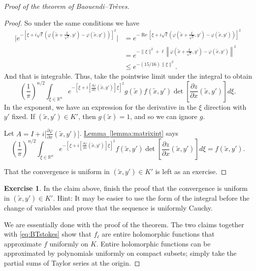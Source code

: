 \documentclass[12pt,openany]{book}
\renewcommand{\Re}{\operatorname{Re}}
\newcommand{\snorm}[1]{\lVert {#1} \rVert}
\newcommand{\bbabs}[1]{\biggl\lvert {#1} \biggr\rvert}
\newcommand{\norm}[1]{\left\lVert {#1} \right\rVert}
\newcommand{\R}{{\mathbb{R}}}
\theoremstyle{plain}
\theoremstyle{remark}
\theoremstyle{definition}
\newenvironment{exbox}{%
    \def\FrameCommand{\vrule width 1pt \relax\hspace{10pt}}%
    \MakeFramed{\advance\hsize-\width\FrameRestore}%
}{%
    \endMakeFramed
}
\theoremstyle{exercise}
\newtheorem{exercise}{Exercise}[section]
\theoremstyle{example}
\newcommand{\lemmaref}[1]{\hyperref[#1]{Lemma~\ref*{#1}}}
\begin{document}
\begin{proof}[Proof of the theorem of Baouendi--Tr{\`e}ves]
\begin{proof}
So under the same conditions we have
\begin{equation*}
\begin{split}
\bbabs{e^{-{\left[\xi +
i\sqrt{\ell}\left(\varphi\left(\tilde{x}+\frac{\xi}{\sqrt{\ell}},y'\right) -
\varphi(\tilde{x},y')\right)\right]}^2}}
& =
e^{-\Re {\left[\xi +
i\sqrt{\ell}\left(\varphi\left(\tilde{x}+\frac{\xi}{\sqrt{\ell}},y'\right) -
\varphi(\tilde{x},y')\right)\right]}^2}
\\
& =
e^{-\snorm{\xi}^2 + \ell
\norm{\varphi\left(\tilde{x}+\frac{\xi}{\sqrt{\ell}},y'\right) -
\varphi(\tilde{x},y')}^2}
\\
& \leq
e^{-(15/16)\snorm{\xi}^2} .
\end{split}
\end{equation*}
And that is integrable.  Thus, take the pointwise limit under the integral to obtain 
\begin{equation*}
{\left(\frac{1}{\pi}\right)}^{n/2}
\int_{\xi \in \R^n}
e^{-{\left[\xi + i\left[ \frac{\partial \varphi}{\partial x}(\tilde{x},y') \right] \xi \right]}^2}
g(\tilde{x})
f(\tilde{x},y')
\det \left[\frac{\partial z}{\partial
x}(\tilde{x},y')\right] d\xi .
\end{equation*}
In the exponent, we have an expression for the derivative
in the $\xi$ direction with $y'$ fixed.  If $(\tilde{x},y') \in K'$, then
$g(\tilde{x}) = 1$, and so we can ignore $g$.

Let $A = I + i \bigl[ \frac{\partial \varphi}{\partial x}(\tilde{x},y')
\bigr]$.  \lemmaref{lemma:matrixint} says
\begin{equation*}
{\left(\frac{1}{\pi}\right)}^{n/2}
\int_{\xi \in \R^n}
e^{-{\left[\xi + i\left[ \frac{\partial \varphi}{\partial x}(\tilde{x},y') \right] \xi \right]}^2}
f(\tilde{x},y')
\det \left[\frac{\partial z}{\partial
x}(\tilde{x},y')\right] d\xi  = f(\tilde{x},y') .
\end{equation*}

That the convergence is uniform in
$(\tilde{x},y') \in K'$ is left as an exercise.
\end{proof}

\begin{exbox}
\begin{exercise}
In the claim above, finish the proof that the convergence is 
uniform in $(\tilde{x},y') \in K'$.
Hint: It may be easier to
use the form of the integral before the change of variables
and prove that the sequence is uniformly Cauchy.
\end{exercise}
\end{exbox}

We are essentially done with the proof of the theorem.
The two claims together with \eqref{eq:BTstokes} show that $f_\ell$ are entire
holomorphic functions that approximate $f$ uniformly on $K$.  Entire holomorphic
functions can be approximated by polynomials uniformly on compact subsets;
simply take the partial sums of Taylor series at the origin.
\end{proof}
\end{document}
